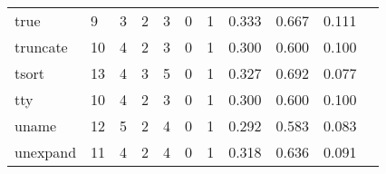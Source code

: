 \begin{longtable}{lp{1.2cm}p{1.2cm}p{1.2cm}p{1.2cm}p{1.2cm}p{1.2cm}p{1.2cm}p{1.2cm}p{1.2cm}p{1.2cm}}
true      &                                     9 &                                                  3 &                                                  2 &                                                  3 &                                                  0 &                                                  1 &                                         0.333 &                                              0.667 &                                              0.111 \\
truncate  &                                    10 &                                                  4 &                                                  2 &                                                  3 &                                                  0 &                                                  1 &                                         0.300 &                                              0.600 &                                              0.100 \\
tsort     &                                    13 &                                                  4 &                                                  3 &                                                  5 &                                                  0 &                                                  1 &                                         0.327 &                                              0.692 &                                              0.077 \\
tty       &                                    10 &                                                  4 &                                                  2 &                                                  3 &                                                  0 &                                                  1 &                                         0.300 &                                              0.600 &                                              0.100 \\
uname     &                                    12 &                                                  5 &                                                  2 &                                                  4 &                                                  0 &                                                  1 &                                         0.292 &                                              0.583 &                                              0.083 \\
unexpand  &                                    11 &                                                  4 &                                                  2 &                                                  4 &                                                  0 &                                                  1 &                                         0.318 &                                              0.636 &                                              0.091 \\

\end{longtable}
